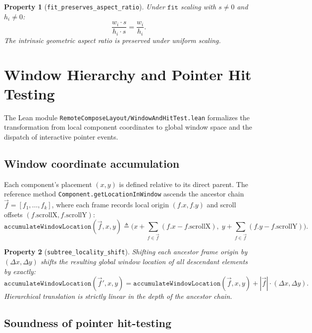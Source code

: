\documentclass[11pt,a4paper]{article}
\newcommand{\lo}[1]{\texttt{#1}}       %
\newcommand{\jv}[1]{\texttt{#1}}       %
\newcommand{\file}[1]{\texttt{#1}}
\theoremstyle{definition}
\theoremstyle{plain}
\newtheorem{property}{Property}[section]
\theoremstyle{remark}
\begin{document}
\begin{property}[\lo{fit\_preserves\_aspect\_ratio}]
Under $\lo{fit}$ scaling with $s \ne 0$ and $h_i \ne 0$:
\[
  \frac{w_i \cdot s}{h_i \cdot s} = \frac{w_i}{h_i}.
\]
The intrinsic geometric aspect ratio is preserved under uniform scaling.
\end{property}

\section{Window Hierarchy and Pointer Hit Testing}
\label{sec:window-hit}

The Lean module \file{RemoteComposeLayout/WindowAndHitTest.lean} formalizes
the transformation from local component coordinates to global window space
and the dispatch of interactive pointer events.

\subsection{Window coordinate accumulation}
\label{sec:window-loc}

Each component's placement $(x, y)$ is defined relative to its direct parent.
The reference method \jv{Component.getLocationInWindow} ascends the ancestor chain
$\vec{f} = [f_1, \ldots, f_k]$, where each frame records local origin $(f.x, f.y)$
and scroll offsets $(f.\mathrm{scrollX}, f.\mathrm{scrollY})$:
\[
  \lo{accumulateWindowLocation}(\vec{f}, x, y) \triangleq
  \biggl(x + \sum_{f \in \vec{f}} (f.x - f.\mathrm{scrollX}),\;
         y + \sum_{f \in \vec{f}} (f.y - f.\mathrm{scrollY})\biggr).
\]

\begin{property}[\lo{subtree\_locality\_shift}]
Shifting each ancestor frame origin by $(\Delta x, \Delta y)$ shifts the resulting
global window location of all descendant elements by exactly:
\[
  \lo{accumulateWindowLocation}(\vec{f}', x, y) =
  \lo{accumulateWindowLocation}(\vec{f}, x, y) + |\vec{f}| \cdot (\Delta x, \Delta y).
\]
Hierarchical translation is strictly linear in the depth of the ancestor chain.
\end{property}

\subsection{Soundness of pointer hit-testing}
\label{sec:hittest}
\end{document}
